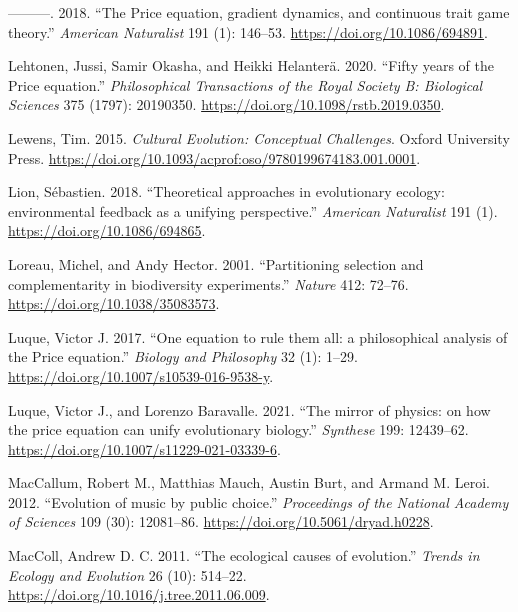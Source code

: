 \documentclass[
]{article}
\newlength{\cslhangindent}
\newlength{\cslentryspacingunit} %
\newenvironment{CSLReferences}[2] %
 {%
  \setlength{\parindent}{0pt}
  \ifodd #1
  \let\oldpar\par
  \def\par{\hangindent=\cslhangindent\oldpar}
  \fi
  \setlength{\parskip}{#2\cslentryspacingunit}
 }%
 {}
\begin{document}
\begin{CSLReferences}{1}{0}
\leavevmode{}%
---------. 2018. {``{The Price equation, gradient dynamics, and
continuous trait game theory}.''} \emph{American Naturalist} 191 (1):
146--53. \url{https://doi.org/10.1086/694891}.

\leavevmode{}%
Lehtonen, Jussi, Samir Okasha, and Heikki Helanterä. 2020. {``{Fifty
years of the Price equation}.''} \emph{Philosophical Transactions of the
Royal Society B: Biological Sciences} 375 (1797): 20190350.
\url{https://doi.org/10.1098/rstb.2019.0350}.

\leavevmode{}%
Lewens, Tim. 2015. \emph{Cultural Evolution: Conceptual Challenges}.
Oxford University Press.
\url{https://doi.org/10.1093/acprof:oso/9780199674183.001.0001}.

\leavevmode{}%
Lion, Sébastien. 2018. {``{Theoretical approaches in evolutionary
ecology: environmental feedback as a unifying perspective}.''}
\emph{American Naturalist} 191 (1).
\url{https://doi.org/10.1086/694865}.

\leavevmode{}%
Loreau, Michel, and Andy Hector. 2001. {``{Partitioning selection and
complementarity in biodiversity experiments}.''} \emph{Nature} 412:
72--76. \url{https://doi.org/10.1038/35083573}.

\leavevmode{}%
Luque, Victor J. 2017. {``{One equation to rule them all: a
philosophical analysis of the Price equation}.''} \emph{Biology and
Philosophy} 32 (1): 1--29.
\url{https://doi.org/10.1007/s10539-016-9538-y}.

\leavevmode{}%
Luque, Victor J., and Lorenzo Baravalle. 2021. {``{The mirror of
physics: on how the price equation can unify evolutionary biology}.''}
\emph{Synthese} 199: 12439--62.
\url{https://doi.org/10.1007/s11229-021-03339-6}.

\leavevmode{}%
MacCallum, Robert M., Matthias Mauch, Austin Burt, and Armand M. Leroi.
2012. {``{Evolution of music by public choice}.''} \emph{Proceedings of
the National Academy of Sciences} 109 (30): 12081--86.
\url{https://doi.org/10.5061/dryad.h0228}.

\leavevmode{}%
MacColl, Andrew D. C. 2011. {``{The ecological causes of evolution}.''}
\emph{Trends in Ecology and Evolution} 26 (10): 514--22.
\url{https://doi.org/10.1016/j.tree.2011.06.009}.


\end{CSLReferences}
\end{document}
